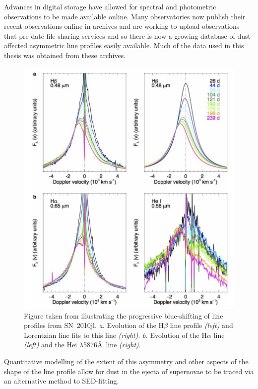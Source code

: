 Advances in digital storage have allowed for spectral and photometric observations to be made  available online.  Many observatories now publish their recent observations online in archives and are working to upload observations that pre-date file sharing services and so there is now a growing database of dust-affected asymmetric line profiles easily available. Much of the data used in this thesis was obtained from these archives.
\begin{figure}[!t]
\centering
\includegraphics[clip=true,scale=0.4,trim= 0 -20 0 -20]{chapters/chapter1/figs/2010jl.png}
\caption{Figure taken from \citet{Gall2014} illustrating the progressive blue-shifting of line profiles from SN~2010jl.  {\em a.} Evolution of the H$\beta$ line profile {\em (left)} and Lorentzian line fits to this line {\em (right)}. {\em b.} Evolution of the H$\alpha$ line {\em (left)} and the He{\sc i} $\lambda$5876\AA\ line {\em (right)}.}
\label{fig:2010jl}
\end{figure}




Quantitative modelling of the extent of this asymmetry and other aspects of the shape of the line profile allow for dust in the ejecta of supernovae to be traced via an alternative method to SED-fitting.  







